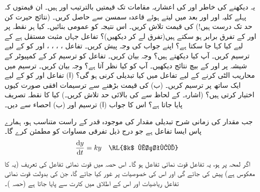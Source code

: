 یہ دیکھنے کی خاطر  اور  کی  اعشاریہ مقامات تک  قیمتیں بالترتیب  اور  ہیں۔ ان قیمتوں کہ پہلے کلیہ  اور اور بعد میں  لیتے ہوئے قاعدہ سمسن سے حاصل کریں۔ (نتائج حیرت کن حد تک درست ہیں!)
 کی قیمت تلاش کریں۔ اس نتیجہ کو عمومی بنائیں۔
کیا ہر نقطہ پر  اور  کے تفرق برابر ہو سکتے ہیں(تفرق لے کر دیکھیں)؟ تفاعل  جہاں  مثبت مستقل ہے کے لیے کیا کہا جا سکتا ہے؟ اپنے جواب کی وجہ پیش کریں۔
تفاعل ، ، ، ،  اور  کو  کے لیے ترسیم کریں۔ آپ کیا دیکھتے ہیں؟ وجہ بیان کریں۔
تفاعل  کو ترسیم کر کے کمپیوٹر کے شیشہ پر   اور  کے بیچ نتائج  دیکھیں۔ آپ کو کیا نظر آتا ہے؟ وجہ بیان کریں۔  ترسیم میں محاریب    الٹی کرنے کے لیے تفاعل میں کیا تبدیلی کرنی ہو گی؟
(ا) تفاعل  اور  کو  کے لیے ایک ساتھ  پر ترسیم کریں۔  (ب)  کی قیمت بڑھنے سے ترسیمات افقی صورت کیوں اختیار کرتی  ہیں؟ (اشارہ۔  کے لحاظ سے  کی بالائی حد تلاش کریں۔)
کیا  کا نقطہ تصریف پایا جاتا ہے؟ اس کا جواب (ا) ترسیم اور (ب) احصاء سے دیں۔




جب مقدار  کی  زمانی  شرح تبدیلی مقدار کی موجودہ  قدر   کے راست متناسب ہو، ہمارے پاس  ایسا تفاعل  ہے    جو درج ذیل تفرقی مساوات کو مطمئن کرے گا۔
\begin{align*}
\frac{\dif y}{\dif t}&=k y&&\text{\RL{$k$ مستقل}}
\end{align*} 
اگر لمحہ  پر  ہو،  یہ تفاعل  قوت نمائی تفاعل  ہو گا۔  اس حصہ میں قوت نمائی تفاعل کی تعریف (یہ  کا معکوس ہے) پیش کی جائے گی اور اس کی خصوصیات  پر غور کیا جائے گا، جن کی بدولت قوت نمائی تفاعل ریاضیات اور  اس کے  اطلاق  میں کثرت سے پایا جاتا ہے (حصہ )۔

